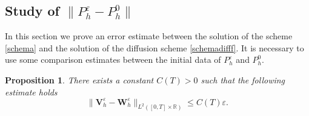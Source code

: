 \documentclass[a4paper,french,english,10pt]{article}
\newcommand\eps{\varepsilon}
\newcommand\V{\mathbf{V}}
\newcommand\W{\mathbf{W}}
\newtheorem{proposition}[theorem]{Proposition}
\begin{document}
\subsection{Study of $\| P_h^\varepsilon - P^0_h  \|$}

In this section we 
 prove an error estimate between the solution of the
scheme \eqref{schema} and the solution of the diffusion scheme
\eqref{schemadifff}.
It is necessary  to use some comparison
estimates between the initial data of $P_h^\eps$ and $P_h^0$.

\begin{proposition} \label{gttods}
There exists a constant $C(T)>0$ such that the following estimate holds
\begin{equation*}
\|\V_h^{\eps}-\W^\eps_h\|_{L^2([0,T]\times\mathbb R)} \leq
C(T)  \eps.
\end{equation*}
\end{proposition}
\end{document}

